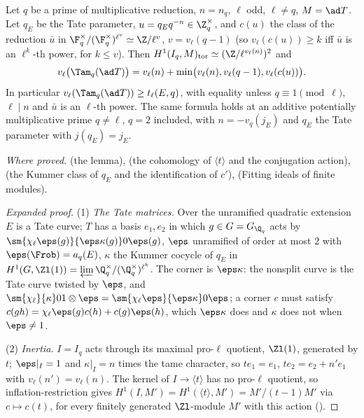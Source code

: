 \begin{sloppypar}
\begin{lemma}\label{lem:paper:tamfactor}
Let $q$ be a prime of multiplicative reduction, $n=n_q$, $\ell$ odd, $\ell\ne q$, $M=\ad T$. Let $q_E$ be the Tate parameter, $u=q_Eq^{-n}\in\Z_q^\times$, and $c(u)$ the class of the
reduction $\bar u$ in $\F_q^\times/(\F_q^\times)^{\ell^v}\simeq\Z/\ell^v$, $v=v_\ell(q-1)$ (so $v_\ell(c(u))\ge k$ iff $\bar u$ is an $\ell^k$-th power, for $k\le v$). Then $H^1(I_q,M)_{\mathrm{tor}}\simeq(\Z/\ell^{v_\ell(n)})^2$ and
\[
v_\ell\bigl(\Tam_q(\ad T)\bigr)=v_\ell(n)+\min\bigl(v_\ell(n),v_\ell(q-1),v_\ell(c(u))\bigr).
\]
In particular $v_\ell(\Tam_q(\ad T))\ge t_\ell(E,q)$, with equality unless $q\equiv1\pmod\ell$, $\ell\mid n$ and $\bar u$ is an $\ell$-th power. The same formula holds at an additive potentially
multiplicative prime $q\ne\ell$, $q=2$ included, with $n=-v_q(j_E)$ and $q_E$ the Tate parameter with $j(q_E)=j_E$.
\end{lemma}

\noindent\emph{Where proved.}  (the lemma),  (the cohomology of $\langle t\rangle$ and the conjugation action),  (the
Kummer class of $q_E$ and the identification of $c'$),  (Fitting ideals of finite modules).

\begin{proof}[Expanded proof]
(1) \emph{The Tate matrices.} Over the unramified quadratic extension $E$ is a Tate curve; $T$ has a basis $e_1,e_2$ in which $g\in G=G_{\Q_q}$ acts by $\sm{\chi_\ell\eps(g)}{\eps\kappa(g)}0{\eps(g)}$,
$\eps$ unramified of order at most $2$ with $\eps(\Frob)=a_q(E)$, $\kappa$ the Kummer cocycle of $q_E$ in $H^1(G,\Zl(1))=\varprojlim\Q_q^\times/(\Q_q^\times)^{\ell^k}$. The corner is $\eps\kappa$: the
nonsplit curve is the Tate curve twisted by $\eps$, and $\sm{\chi_\ell}{\kappa}01\otimes\eps=\sm{\chi_\ell\eps}{\eps\kappa}0{\eps}$; a corner $c$ must satisfy $c(gh)=\chi_\ell\eps(g)c(h)+c(g)\eps(h)$, which
$\eps\kappa$ does and $\kappa$ does not when $\eps\ne1$.

(2) \emph{Inertia.} $I=I_q$ acts through its maximal pro-$\ell$ quotient, $\Zl(1)$, generated by $t$; $\eps|_I=1$ and $\kappa|_I=n$ times the tame character, so $te_1=e_1$,
$te_2=e_2+n'e_1$ with $v_\ell(n')=v_\ell(n)$. The kernel of $I\to\langle t\rangle$ has no pro-$\ell$ quotient, so inflation-restriction gives $H^1(I,M')=H^1(\langle t\rangle,M')=M'/(t-1)M'$
via $c\mapsto c(t)$, for every finitely generated $\Zl$-module $M'$ with this action ().


\end{proof}
\end{sloppypar}
